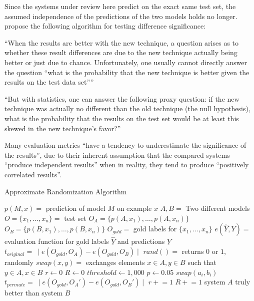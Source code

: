 Since the systems under review here predict on the exact same test set, the assumed independence
of the predictions of the two models holds no longer. \citet{morgan2005statistical} propose
the following algorithm for testing difference significance:

``When the results are better with the new technique, a question arises as to whether
these result differences are due to the new technique actually being better or just due to
chance. Unfortunately, one usually cannot directly answer the question “what is the probability
that the new technique is better given the results on the test data set”'' \citep{yeh2000more}

``But with statistics, one can answer the following proxy question: if the new technique was
actually no different than the old technique (the null hypothesis), what is the probability
that the results on the test set would be at least this skewed in the new technique’s
favor?'' \citep{yeh2000more}

Many evaluation metrics ``have a tendency to underestimate the significance of the results'',
due to their inherent assumption that the compared systems ``produce independent results''
when in reality, they tend to produce ``positively correlated results''. \citep{yeh2000more}


\begin{algorithm}
\caption{Approximate Randomization Algorithm}
\label{alg:approximate-randomization}
	\begin{algorithmic}[1]
    \STATE $p(M,x) =$ prediction of model $M$ on example $x$
    \STATE $A, B =$ Two different models
    \STATE $O = \{x_1, \dotsc, x_n\} =$ test set
    \STATE $O_A = \{p(A,x_1), \dotsc, p(A,x_n)\}$
    \STATE $O_B = \{p(B,x_1), \dotsc, p(B,x_n)\}$
    \STATE $O_{gold} =$ gold labels for $\{x_1, \dotsc, x_n\}$
    \STATE $e(\hat{Y},Y) =$ evaluation function for gold labels $\hat{Y}$ and predictions $Y$
    \STATE $t_{original} =\ \mid e(O_{gold},O_A) - e(O_{gold},O_B) \mid$
    \STATE $rand() =$ returns $0$ or $1$, randomly
    \STATE $swap(x,y) =$ exchanges elements $x \in A,y \in B$ such that $y \in A, x \in B$
    \STATE $r \leftarrow 0$
    \STATE $R \leftarrow 0$
    \STATE $threshold \leftarrow 1,000$
    \STATE $p \leftarrow 0.05$
          \STATE $swap(a_i,b_i)$
        \ENDIF
      \ENDFOR
      \STATE $t_{permute} =\ \mid e(O_{gold},O_A') - e(O_{gold},O_B') \mid$
        \STATE $r \mathrel{+}= 1$
      \ENDIF
      \STATE $R \mathrel{+}= 1$
    \ENDWHILE
      \STATE system $A$ truly better than system $B$
    \ENDIF
  \end{algorithmic}
\end{algorithm}


